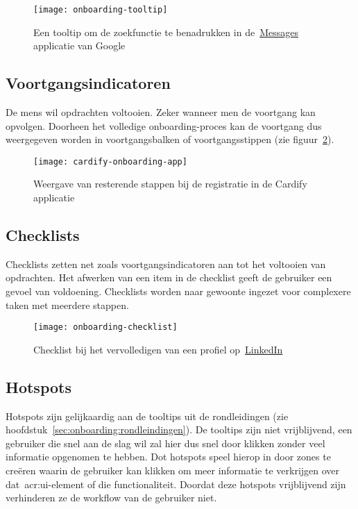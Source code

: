 \begin{figure}[h!]
    \centering
    \texttt{[image: onboarding-tooltip]}
    \caption[Voorbeeld tooltip]{Een tooltip om de zoekfunctie te benadrukken in de~\href{https://messages.google.com/}{Messages} applicatie van Google}
    \label{fig:onboarding:rondleiding}
\end{figure}

\subsection{Voortgangsindicatoren}
\label{sec:onboarding:voortgang}

De mens wil opdrachten voltooien. Zeker wanneer men de voortgang kan opvolgen. Doorheen het volledige onboarding-proces kan de voortgang dus weergegeven worden in voortgangsbalken of voortgangsstippen (zie figuur~\ref{fig:onboarding:voortgang}).

\begin{figure}[h!]
    \centering
    \texttt{[image: cardify-onboarding-app]}
    \caption[Voorbeeld voortgangsindicatoren]{Weergave van resterende stappen bij de registratie in de Cardify applicatie}
    \label{fig:onboarding:voortgang}
\end{figure}

\subsection{Checklists}
\label{sec:onboarding:checklists}

Checklists zetten net zoals voortgangsindicatoren aan tot het voltooien van opdrachten. Het afwerken van een item in de checklist geeft de gebruiker een gevoel van voldoening. Checklists worden naar gewoonte ingezet voor complexere taken met meerdere stappen.

\begin{figure}[h!]
    \centering
    \texttt{[image: onboarding-checklist]}
    \caption[Voorbeeld checklist]{Checklist bij het vervolledigen van een profiel op~\href{https://www.linkedin.com/}{LinkedIn}}
    \label{fig:onboarding:checklist}
\end{figure}

\subsection{Hotspots}
\label{sec:onboarding:hotspots}

Hotspots zijn gelijkaardig aan de tooltips uit de rondleidingen (zie hoofdstuk~\ref{sec:onboarding:rondleindingen}). De tooltips zijn niet vrijblijvend, een gebruiker die snel aan de slag wil zal hier dus snel door klikken zonder veel informatie opgenomen te hebben. Dot hotspots speel hierop in door zones te creëren waarin de gebruiker kan klikken om meer informatie te verkrijgen over dat~\acrshort{acr:ui}-element of die functionaliteit. Doordat deze hotspots vrijblijvend zijn verhinderen ze de workflow van de gebruiker niet.

